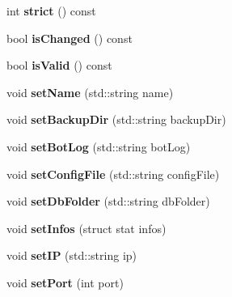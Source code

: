 \begin{DoxyCompactItemize}
\item 
\hypertarget{class_server_aa068cd9e955b558e798482e9d140017e}{
int {\bfseries strict} () const }
\label{class_server_aa068cd9e955b558e798482e9d140017e}

\item 
\hypertarget{class_server_ad7d94c75cdf0c2c588239c3dd8897c86}{
bool {\bfseries isChanged} () const }
\label{class_server_ad7d94c75cdf0c2c588239c3dd8897c86}

\item 
\hypertarget{class_server_a85f86157593eeb3b908fa820b2b5028e}{
bool {\bfseries isValid} () const }
\label{class_server_a85f86157593eeb3b908fa820b2b5028e}

\item 
\hypertarget{class_server_a141de2900d7c86b5be1980472ac77fd6}{
void {\bfseries setName} (std::string name)}
\label{class_server_a141de2900d7c86b5be1980472ac77fd6}

\item 
\hypertarget{class_server_a86601c79167e12b99df3aaae667ee46c}{
void {\bfseries setBackupDir} (std::string backupDir)}
\label{class_server_a86601c79167e12b99df3aaae667ee46c}

\item 
\hypertarget{class_server_a48e61e5487bf1b8c575e58570c5936d8}{
void {\bfseries setBotLog} (std::string botLog)}
\label{class_server_a48e61e5487bf1b8c575e58570c5936d8}

\item 
\hypertarget{class_server_a5f34b9b94ffe4479429e82e1c70684a1}{
void {\bfseries setConfigFile} (std::string configFile)}
\label{class_server_a5f34b9b94ffe4479429e82e1c70684a1}

\item 
\hypertarget{class_server_ae9f18501df8c8faa329c2efd4bbdb0ca}{
void {\bfseries setDbFolder} (std::string dbFolder)}
\label{class_server_ae9f18501df8c8faa329c2efd4bbdb0ca}

\item 
\hypertarget{class_server_ac9100e27c260825017b0bac6f735b6a7}{
void {\bfseries setInfos} (struct stat infos)}
\label{class_server_ac9100e27c260825017b0bac6f735b6a7}

\item 
\hypertarget{class_server_abe96cf7d06b806cbcf19064e58bf9397}{
void {\bfseries setIP} (std::string ip)}
\label{class_server_abe96cf7d06b806cbcf19064e58bf9397}

\item 
\hypertarget{class_server_a477fef3ccc9b71a29d2254cc98e85480}{
void {\bfseries setPort} (int port)}
\label{class_server_a477fef3ccc9b71a29d2254cc98e85480}


\end{DoxyCompactItemize}
